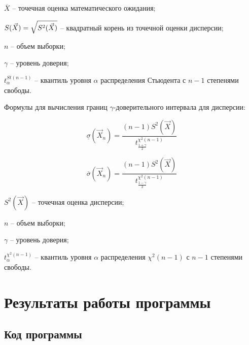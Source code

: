 \documentclass[12pt]{report}
\begin{document}
$\overline X$ -- точечная оценка математического ожидания;

$S(\vec X) = \sqrtsign{S^2(\vec X)}$ -- квадратный корень из точечной оценки дисперсии;

$n$ -- объем выборки;

$\gamma$ -- уровень доверия;

$t^{St(n-1)}_{\alpha}$ -- квантиль уровня $\alpha$ распределения Стьюдента с $n - 1$ степенями свободы.

Формулы для вычисления границ $\gamma$-доверительного интервала для дисперсии:

\begin{equation}
\underline\sigma(\vec X_n)= \frac{(n-1)S^2(\vec X)}{t^{\chi^2(n-1)}_{\frac{1+\gamma}{2}}}
\end{equation}

\begin{equation}
\overline\sigma(\vec X_n)= \frac{(n-1)S^2(\vec X)}{t^{\chi^2(n-1)}_{\frac{1-\gamma}{2}}}
\end{equation}

$S^2(\vec X)$ -- точечная оценка дисперсии;

$n$ -- объем выборки;

$\gamma$ -- уровень доверия;

$t^{\chi^2(n-1)}_{\alpha}$ -- квантиль уровня $\alpha$ распределения $\chi^2(n-1)$ с $n - 1$ степенями свободы.


\chapter*{Результаты работы программы}

\section*{Код программы}
\end{document}
